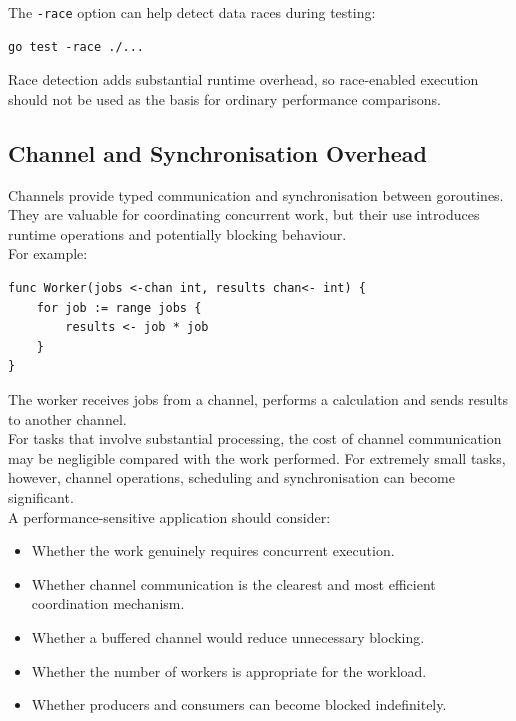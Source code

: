 The \texttt{-race} option can help detect data races during testing:

\begin{lstlisting}
go test -race ./...
\end{lstlisting}

Race detection adds substantial runtime overhead, so race-enabled execution should not be used as the basis for ordinary performance comparisons.\\

\subsection{Channel and Synchronisation Overhead}

Channels provide typed communication and synchronisation between goroutines. They are valuable for coordinating concurrent work, but their use introduces runtime operations and potentially blocking behaviour.\\

For example:

\begin{lstlisting}
func Worker(jobs <-chan int, results chan<- int) {
    for job := range jobs {
        results <- job * job
    }
}
\end{lstlisting}

The worker receives jobs from a channel, performs a calculation and sends results to another channel.\\

For tasks that involve substantial processing, the cost of channel communication may be negligible compared with the work performed. For extremely small tasks, however, channel operations, scheduling and synchronisation can become significant.\\

A performance-sensitive application should consider:

\begin{itemize}
    \item Whether the work genuinely requires concurrent execution.
    \item Whether channel communication is the clearest and most efficient coordination mechanism.
    \item Whether a buffered channel would reduce unnecessary blocking.
    \item Whether the number of workers is appropriate for the workload.
    \item Whether producers and consumers can become blocked indefinitely.
\end{itemize}

